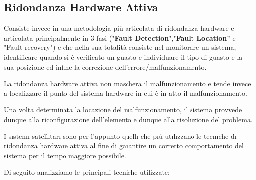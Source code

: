 \documentclass[LaM,binding=0.6cm]{../sapthesis}
\begin{document}
\subsection{Ridondanza Hardware Attiva}

Consiste invece in una metodologia più articolata di ridondanza hardware e articolata principalmente in 3 fasi ("\textbf{Fault Detection}","\textbf{Fault Location"} e {"Fault recovery"}) e che nella sua totalità consiste nel monitorare un sistema, identificare quando si è verificato un guasto e individuare il tipo di guasto e la sua posizione ed infine la correzione dell'errore/malfunzionamento.

La ridondanza hardware attiva non maschera il malfunzionamento e tende invece a localizzare il punto del sistema hardware in cui è in atto il malfunzionamento. 

Una volta determinata la locazione del malfunzionamento, il sistema provvede dunque alla riconfigurazione dell'elemento e dunque alla risoluzione del problema.

I sistemi satellitari sono per l'appunto quelli che più utilizzano le tecniche di ridondanza hardware attiva al fine di garantire un corretto comportamento del sistema per il tempo maggiore possibile.

Di seguito analizziamo le principali tecniche utilizzate:
\end{document}

